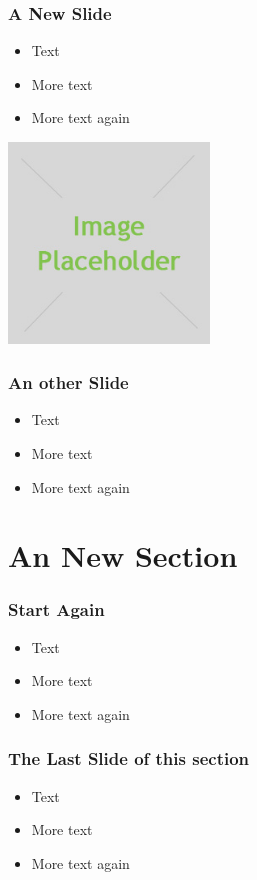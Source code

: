 \begin{frame} 
\frametitle{A New Slide}
\begin{itemize}[<+->]
 \item Text
 \item More text
 \item More text again
\end{itemize}
\begin{center}
  \includegraphics[width=0.4\textwidth]{images/placeholder.jpg}
\end{center}
\end{frame}

\begin{frame} 
\frametitle{An other Slide}
\begin{itemize}[<+->]
 \item Text
 \item More text
 \item More text again
\end{itemize}
\end{frame}

\section{An New Section}
\begin{frame} 
\frametitle{Start Again}
\begin{itemize}[<+->]
 \item Text
 \item More text
 \item More text again
\end{itemize}
\end{frame}

\begin{frame} 
\frametitle{The Last Slide of this section}
\begin{itemize}[<+->]
 \item Text
 \item More text
 \item More text again
\end{itemize}
\end{frame}

